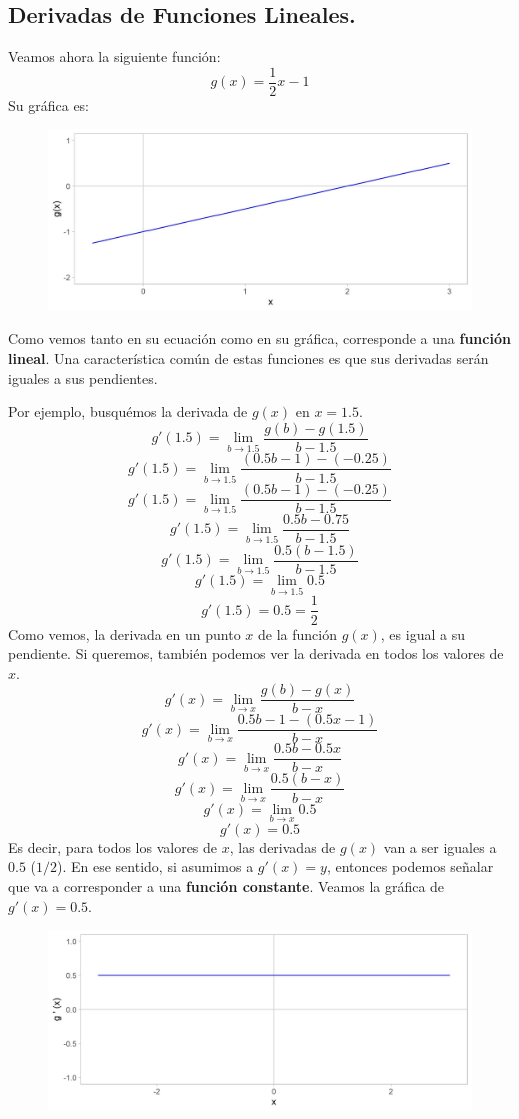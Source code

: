 \documentclass[12pt]{article}
\begin{document}
\newpage

\subsection{Derivadas de Funciones Lineales.}

Veamos ahora la siguiente función:
\[g(x) = \frac{1}{2}x - 1\]
Su gráfica es:

\begin{figure}[hbt!]
\centering
\includegraphics[scale=0.7]{img/linear_fun.jpg}
\end{figure}

Como vemos tanto en su ecuación como en su gráfica, corresponde a una \textbf{función lineal}. Una característica común de estas funciones es que sus derivadas serán iguales a sus pendientes.

Por ejemplo, busquémos la derivada de $g(x)$ en $x = 1.5$.
\[g'(1.5) = \lim_{b \to 1.5} \frac{g(b)-g(1.5)}{b-1.5}\]
\[g'(1.5) = \lim_{b \to 1.5} \frac{(0.5b-1)-(-0.25)}{b-1.5}\]
\[g'(1.5) = \lim_{b \to 1.5} \frac{(0.5b-1)-(-0.25)}{b-1.5}\]
\[g'(1.5) = \lim_{b \to 1.5} \frac{0.5b-0.75}{b-1.5}\]
\[g'(1.5) = \lim_{b \to 1.5} \frac{0.5(b-1.5)}{b-1.5}\]
\[g'(1.5) = \lim_{b \to 1.5} 0.5\]
\[g'(1.5) = 0.5 = \frac{1}{2}\]
Como vemos, la derivada en un punto $x$ de la función $g(x)$, es igual a su pendiente. Si queremos, también podemos ver la derivada en todos los valores de $x$.
\[g'(x) = \lim_{b \to x} \frac{g(b)-g(x)}{b-x}\]
\[g'(x) = \lim_{b \to x} \frac{0.5b-1-(0.5x-1)}{b-x}\]
\[g'(x) = \lim_{b \to x} \frac{0.5b-0.5x}{b-x}\]
\[g'(x) = \lim_{b \to x} \frac{0.5(b-x)}{b-x}\]
\[g'(x) = \lim_{b \to x} 0.5\]
\[g'(x) = 0.5\]
Es decir, para todos los valores de $x$, las derivadas de $g(x)$ van a ser iguales a $0.5$ ($1/2$). En ese sentido, si asumimos a $g'(x) = y$, entonces podemos señalar que va a corresponder a una \textbf{función constante}. Veamos la gráfica de $g'(x) = 0.5$.

\begin{figure}[hbt!]
\centering
\includegraphics[scale=0.7]{img/deriv_linear_fun.jpg}
\end{figure}
\end{document}
